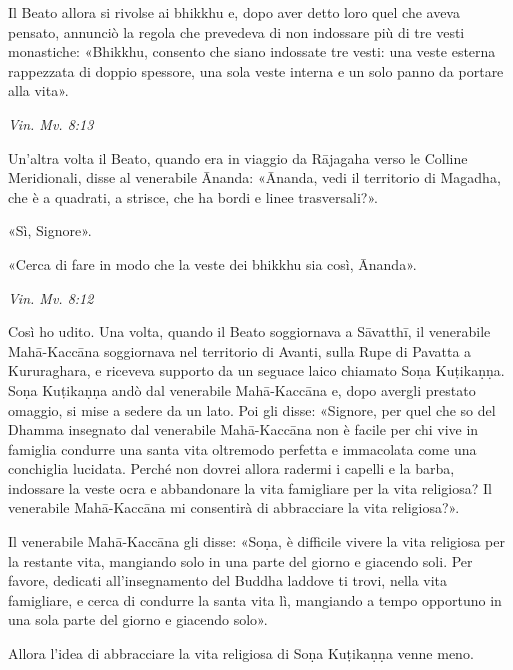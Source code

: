 Il Beato allora si rivolse ai bhikkhu e, dopo aver detto loro quel che
aveva pensato, annunciò la regola che prevedeva di non indossare più di
tre vesti monastiche: «Bhikkhu, consento che siano indossate tre vesti:
una veste esterna rappezzata di doppio spessore, una sola veste interna
e un solo panno da portare alla vita».


\emph{Vin. Mv. 8:13}


Un’altra volta il Beato, quando era in viaggio da Rājagaha verso le
Colline Meridionali, disse al venerabile Ānanda: «Ānanda, vedi il
territorio di Magadha, che è a quadrati, a strisce, che ha bordi e linee
trasversali?».


«Sì, Signore».


«Cerca di fare in modo che la veste dei bhikkhu sia così, Ānanda».


\emph{Vin. Mv. 8:12}


 Così ho udito. Una volta, quando il Beato soggiornava a
Sāvatthī, il venerabile Mahā-Kaccāna soggiornava nel territorio di
Avanti, sulla Rupe di Pavatta a Kururaghara, e riceveva supporto da un
seguace laico chiamato Soṇa Kuṭikaṇṇa. Soṇa Kuṭikaṇṇa andò dal
venerabile Mahā-Kaccāna e, dopo avergli prestato omaggio, si mise a
sedere da un lato. Poi gli disse: «Signore, per quel che so del Dhamma
insegnato dal venerabile Mahā-Kaccāna non è facile per chi vive in
famiglia condurre una santa vita oltremodo perfetta e immacolata come
una conchiglia lucidata. Perché non dovrei allora radermi i capelli e la
barba, indossare la veste ocra e abbandonare la vita famigliare per la
vita religiosa? Il venerabile Mahā-Kaccāna mi consentirà di abbracciare
la vita religiosa?».


Il venerabile Mahā-Kaccāna gli disse: «Soṇa, è difficile vivere la vita
religiosa per la restante vita, mangiando solo in una parte del giorno e
giacendo soli. Per favore, dedicati all’insegnamento del Buddha laddove
ti trovi, nella vita famigliare, e cerca di condurre la santa vita lì,
mangiando a tempo opportuno in una sola parte del giorno e giacendo
solo».


Allora l’idea di abbracciare la vita religiosa di Soṇa Kuṭikaṇṇa venne
meno.


